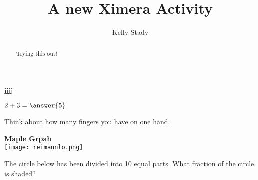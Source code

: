 \documentclass[handout]{ximera}
\title{A new Ximera Activity}
\author{Kelly Stady}
\begin{document}
\begin{abstract}
    Trying this out!
\end{abstract}
\maketitle

jjjj


\begin{question}
    $2+3=\answer{5}$

\begin{hint}  %
Think about how many fingers you have on one hand.
\end{hint}

\end{question}




\begin{center} %
\textbf{Maple Grpah} \\

    \texttt{[image: reimannlo.png]}
\end{center}


\begin{question}
 The circle below has been divided into 10 equal parts.  What fraction of the circle is shaded? \\ \\


\begin{center} 
\hspace{0.8in} 
\end{center}

\begin{multipleChoice}
\end{multipleChoice}

\end{question}
\end{document}
